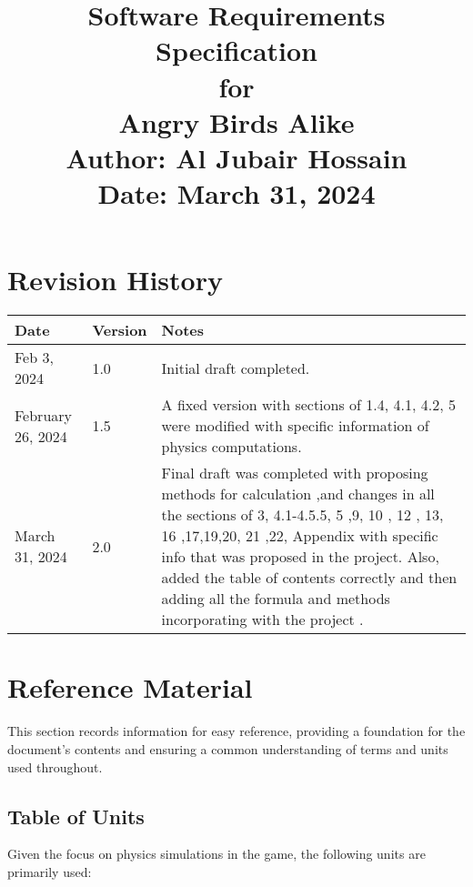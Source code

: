 \documentclass[12pt]{article}
\title{
    {\Huge Software Requirements Specification} \\
    {\Large for} \\
    {\Large Angry Birds Alike} \\
    \vspace{0.5em}
    {\Large Author: Al Jubair Hossain} \\
    \vspace{0.5em}
    {\large Date: March 31, 2024}
}
\date{}
\begin{document}
\maketitle

\newpage

\section*{Revision History}
\begin{longtable}{|p{2cm}|p{2cm}|p{10cm}|}
    \hline
    \textbf{Date} & \textbf{Version} & \textbf{Notes} \\
    \hline
    Feb 3, 2024 & 1.0 & Initial draft completed. \\\hline
    February 26, 2024 & 1.5 & A fixed version with sections of 1.4, 4.1, 4.2, 5 were modified with specific information of physics computations. \\\hline
    March 31, 2024 & 2.0 & Final draft was completed with proposing methods for calculation ,and changes in all the sections of 3, 4.1-4.5.5, 5 ,9, 10 , 12 , 13, 16 ,17,19,20, 21 ,22, Appendix with specific info that was proposed in the project. Also, added the table of contents correctly and then adding all the formula and methods incorporating with the project . \\
    \hline
\end{longtable}

\newpage

\tableofcontents

\newpage

\section{Reference Material}
This section records information for easy reference, providing a foundation for the document's contents and ensuring a common understanding of terms and units used throughout.

\subsection{Table of Units}
Given the focus on physics simulations in the game, the following units are primarily used:
\end{document}
